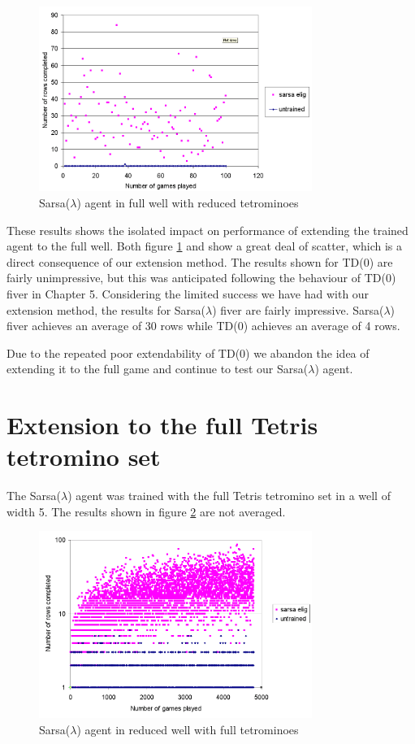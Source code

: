 \documentclass{rucsthesis}
\begin{document}
\begin{figure}[h]
\centering
\includegraphics[width=3.5in]{sarsaeligredtetfullwell.png}
\caption{Sarsa($\lambda$) agent in full well with reduced tetrominoes}
\label{fig:sarsaeligredtetfullwell}
\end{figure}

These results shows the isolated impact on performance of extending the trained agent to the full well. Both figure \ref{fig:sarsaeligredtetfullwell} and \label{fig:afterstatesredtetfullwell} show a great deal of scatter, which is a direct consequence of our extension method. The results shown for TD(0) are fairly unimpressive, but this was anticipated following the behaviour of TD(0) fiver in Chapter 5. Considering the limited success we have had with our extension method, the results for Sarsa($\lambda$) fiver are fairly impressive.  Sarsa($\lambda$) fiver achieves an average of 30 rows while TD(0) achieves an average of 4 rows.

Due to the repeated poor extendability of TD(0) we abandon the idea of extending it to the full game and continue to test our Sarsa($\lambda$) agent.

\section{Extension to the full Tetris tetromino set}

The Sarsa($\lambda$) agent was trained with the full Tetris tetromino set in a well of width 5. The results shown in figure \ref{fig:sarsaeligfulltetredwell} are not averaged.

\begin{figure}[h]
\centering
\includegraphics[width=3.5in]{sarsaeligfulltetredwell.png}
\caption{Sarsa($\lambda$) agent in reduced well with full tetrominoes}
\label{fig:sarsaeligfulltetredwell}
\end{figure}
\end{document}
